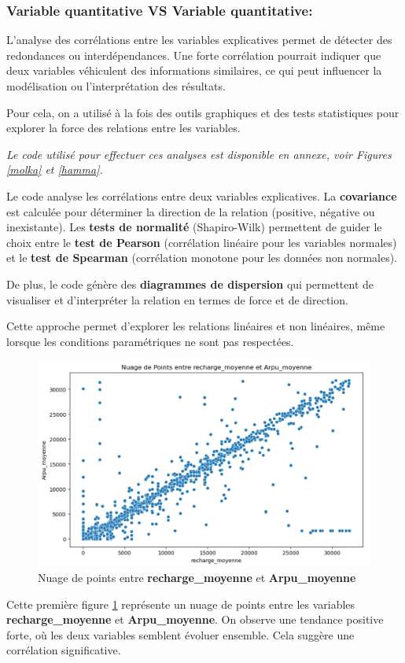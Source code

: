 \subsubsection*{Variable quantitative VS Variable quantitative:}
L'analyse des corrélations entre les variables explicatives permet de détecter des redondances ou interdépendances. Une forte corrélation pourrait indiquer que deux variables véhiculent des informations similaires, ce qui peut influencer la modélisation ou l'interprétation des résultats.

Pour cela, on a utilisé à la fois des outils graphiques et des tests statistiques pour explorer la force des relations entre les variables.

\textit{Le code utilisé pour effectuer ces analyses est disponible en annexe, voir Figures \ref{molka} et \ref{hamma}.}

Le code analyse les corrélations entre deux variables explicatives. La \textbf{covariance} est calculée pour déterminer la direction de la relation (positive, négative ou inexistante). Les \textbf{tests de normalité} (Shapiro-Wilk) permettent de guider le choix entre le \textbf{test de Pearson} (corrélation linéaire pour les variables normales) et le \textbf{test de Spearman} (corrélation monotone pour les données non normales).

De plus, le code génère des \textbf{diagrammes de dispersion} qui permettent de visualiser et d'interpréter la relation en termes de force et de direction.

Cette approche permet d'explorer les relations linéaires et non linéaires, même lorsque les conditions paramétriques ne sont pas respectées.


\begin{figure}[H]
    \centering
    \includegraphics[width=0.6\linewidth]{capture_sas_47.png}
    \caption{Nuage de points entre \textbf{recharge\_moyenne} et \textbf{Arpu\_moyenne}}
    \label{nuage1}
\end{figure}

\noindent
Cette première figure \ref{nuage1} représente un nuage de points entre les variables \textbf{recharge\_moyenne} et \textbf{Arpu\_moyenne}. On observe une tendance positive forte, où les deux variables semblent évoluer ensemble. Cela suggère une corrélation significative.

